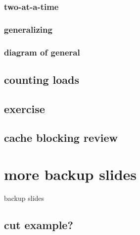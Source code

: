 \subsubsection{two-at-a-time}

%

\subsubsection{generalizing}


\subsubsection{diagram of general}


%

\subsection{counting loads}
%


\subsection{exercise}



\subsection{cache blocking review}


\section{more backup slides}
\begin{frame}{backup slides}
\end{frame}

\subsection{cut example?}


